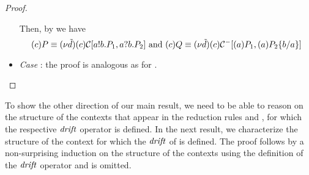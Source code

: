 \begin{proof}
\begin{itemize}
Then, by  we have  
\[
(c)P\equiv (\nu \tilde {d})(c)\mathcal{C}[a!b.P_1, a?b.P_2] \text{ and } 
(c) Q\equiv (\nu \tilde {d})(c)\mathcal{C}^-[(a)P_1, (a)P_2\{b/a\}]
\]
\item \emph{Case} : the proof is analogous as for .
\end{itemize}
\end{proof}

To show the other direction of our main result, we need to be able to reason on the structure of the contexts that appear in the reduction rules  and , for which the respective $\mathit {drift}$ operator is defined. In the next result, we characterize the structure of the context for which the $\mathit {drift}$ of  is defined. The proof follows by a non-surprising induction on the structure of the contexts using the definition of the $\mathit {drift}$ operator and is omitted.

